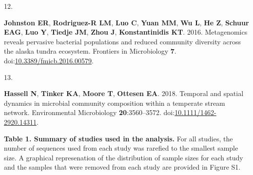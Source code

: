 \documentclass[
]{article}
\newlength{\cslhangindent}
\newlength{\csllabelwidth}
\newlength{\cslentryspacingunit} %
\newenvironment{CSLReferences}[2] %
 {%
  \setlength{\parindent}{0pt}
  \ifodd #1
  \let\oldpar\par
  \def\par{\hangindent=\cslhangindent\oldpar}
  \fi
  \setlength{\parskip}{#2\cslentryspacingunit}
 }%
 {}
\newcommand{\CSLLeftMargin}[1]{\parbox[t]{\csllabelwidth}{#1}}
\newcommand{\CSLRightInline}[1]{\parbox[t]{\linewidth - \csllabelwidth}{#1}\break}
\begin{document}
\begin{CSLReferences}{0}{1}
\leavevmode{}%
\CSLLeftMargin{12. }%
\CSLRightInline{\textbf{Johnston ER}, \textbf{Rodriguez-R LM},
\textbf{Luo C}, \textbf{Yuan MM}, \textbf{Wu L}, \textbf{He Z},
\textbf{Schuur EAG}, \textbf{Luo Y}, \textbf{Tiedje JM}, \textbf{Zhou
J}, \textbf{Konstantinidis KT}. 2016. Metagenomics reveals pervasive
bacterial populations and reduced community diversity across the alaska
tundra ecosystem. Frontiers in Microbiology \textbf{7}.
doi:\href{https://doi.org/10.3389/fmicb.2016.00579}{10.3389/fmicb.2016.00579}.}

\leavevmode{}%
\CSLLeftMargin{13. }%
\CSLRightInline{\textbf{Hassell N}, \textbf{Tinker KA}, \textbf{Moore
T}, \textbf{Ottesen EA}. 2018. Temporal and spatial dynamics in
microbial community composition within a temperate stream network.
Environmental Microbiology \textbf{20}:3560--3572.
doi:\href{https://doi.org/10.1111/1462-2920.14311}{10.1111/1462-2920.14311}.}

\end{CSLReferences}


\setlength{\parindent}{0in}
\setlength{\leftskip}{0in}

\newpage

\textbf{Table 1. Summary of studies used in the analysis.} For all
studies, the number of sequences used from each study was rarefied to
the smallest sample size. A graphical represenation of the distribution
of sample sizes for each study and the samples that were removed from
each study are provided in Figure S1.

\small
\end{document}
